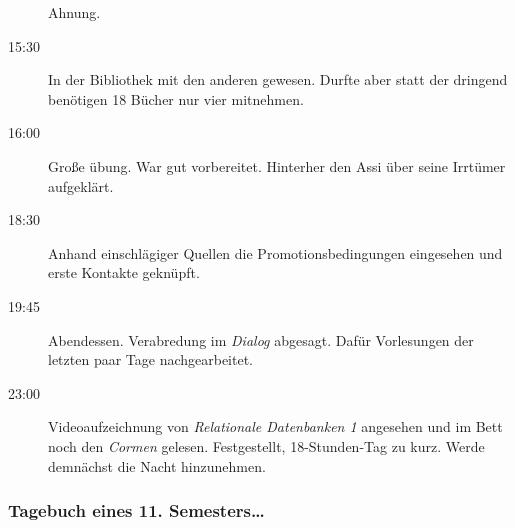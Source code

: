 \begin{multicols}{2}
\begin{description}
Ahnung.
\item[15:30] In der Bibliothek mit den anderen gewesen. Durfte aber statt der
dringend benötigen 18 Bücher nur vier mitnehmen.
\item[16:00] Große übung. War gut vorbereitet. Hinterher den Assi über seine
Irrtümer aufgeklärt.
\item[18:30] Anhand einschlägiger Quellen die Promotionsbedingungen eingesehen und
erste Kontakte geknüpft.
\item[19:45] Abendessen. Verabredung im \emph{Dialog} abgesagt. Dafür Vorlesungen
der letzten paar Tage nachgearbeitet.
\item[23:00] Videoaufzeichnung von \emph{Relationale Datenbanken 1} angesehen und im Bett noch den \emph{Cormen}
gelesen. Festgestellt, 18-Stunden-Tag zu kurz. Werde demnächst die Nacht
hinzunehmen.
\end{description}
\newpage
\subsubsection{Tagebuch eines 11. Semesters\ldots}


\end{multicols}
